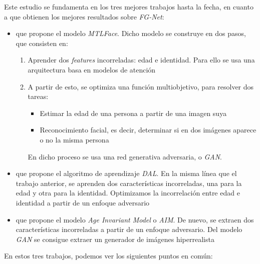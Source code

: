 Este estudio se fundamenta en los tres mejores trabajos hasta la fecha, en cuanto a que obtienen los mejores resultados sobre \textit{FG-Net}:

\begin{itemize}
	\item {} \cite{informatica:best_fgnet_model} que propone el modelo \textit{MTLFace}. Dicho modelo se construye en dos pasos, que consisten en:
	      \begin{enumerate}
		      \item Aprender dos \textit{features} incorreladas: edad e identidad. Para ello se usa una arquitectura basa en modelos de atención
		      \item A partir de esto, se optimiza una función multiobjetivo, para resolver dos tareas:
		            \begin{itemize}
			            \item Estimar la edad de una persona a partir de una imagen suya
			            \item Reconocimiento facial, es decir, determinar si en dos imágenes aparece o no la misma persona
		            \end{itemize}
		            En dicho proceso se usa una red generativa adversaria, o \textit{GAN}.
	      \end{enumerate}
	\item {} \cite{informatica:dal} que propone el algoritmo de aprendizaje \textit{DAL}. En la misma línea que el trabajo anterior, se aprenden dos características incorreladas, una para la edad y otra para la identidad. Optimizamos la incorrelación entre edad e identidad a partir de un enfoque adversario
	\item {} \cite{informatica:aim} que propone el modelo \textit{Age Invariant Model} o \textit{AIM}. De nuevo, se extraen dos características incorreladas a partir de un enfoque adversario. Del modelo \textit{GAN} se consigue extraer un generador de imágenes hiperrealista
\end{itemize}

En estos tres trabajos, podemos ver los siguientes puntos en común:

